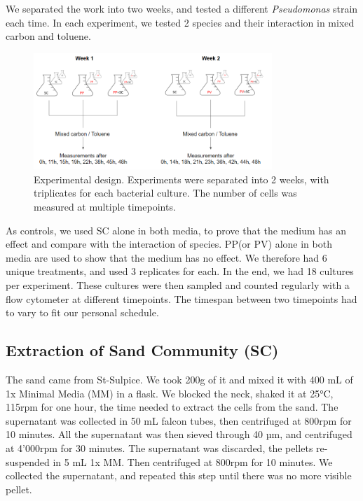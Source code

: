 \documentclass[a4paper, 10pt, conference]{ieeeconf}   %
\begin{document}
We separated the work into two weeks, and tested a different \textit{Pseudomonas} strain each time. In each experiment, we tested 2 species and their interaction in mixed carbon and toluene.

\begin{figure}[H]

	  
		\includegraphics[width=9cm]{erlenmeyer.PNG}
		\caption{Experimental design. Experiments were separated into 2 weeks, with triplicates for each bacterial culture. The number of cells was measured at multiple timepoints.}
		\label{design_weeks}
	
\end{figure}

As controls, we used SC alone in both media, to prove that the medium has an effect and compare with the interaction of species. PP(or PV) alone in both media are used to show that the medium has no effect.
We therefore had 6 unique treatments, and used 3 replicates for each. In the end, we had 18 cultures per experiment. These cultures were then sampled and counted regularly with a flow cytometer at different timepoints. The timespan between two timepoints had to vary to fit our personal schedule.


\subsection{Extraction of Sand Community (SC)}
The sand came from St-Sulpice. We took 200g of it and mixed it with 400 mL of 1x Minimal Media (MM) in a flask. We blocked the neck, shaked it at 25°C, 115rpm for one hour, the time needed to extract the cells from the sand. The supernatant was collected in 50 mL falcon tubes, then centrifuged at 800rpm for 10 minutes. All the supernatant was then sieved through 40 µm, and centrifuged at 4’000rpm for 30 minutes. The supernatant was discarded, the pellets re-suspended in 5 mL 1x MM. Then centrifuged at 800rpm for 10 minutes. We collected the supernatant, and repeated this step until there was no more visible pellet.
\end{document}
